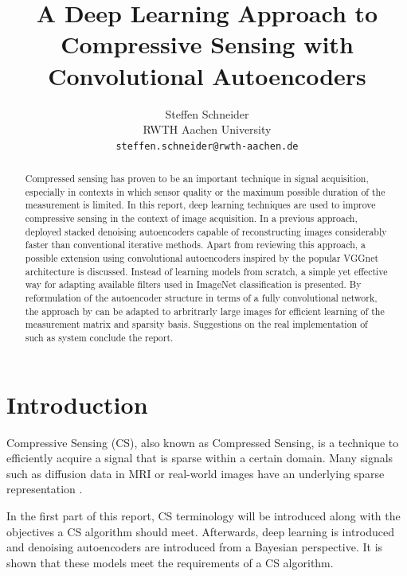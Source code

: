 \documentclass[10pt,twocolumn,a4paper]{article}
\newcommand{\abbr}[2]{#1 (#2)}
\begin{document}
\title{A Deep Learning Approach to\\Compressive Sensing with Convolutional Autoencoders}

\author{Steffen Schneider\\
RWTH Aachen University\\
{\tt\small steffen.schneider@rwth-aachen.de}
}

\maketitle

\begin{abstract}
    Compressed sensing has proven to be an important technique in signal acquisition, especially in contexts in which sensor quality or the maximum possible duration of the measurement is limited. 
    In this report, deep learning techniques are used to improve compressive sensing in the context of image acquisition.
    In a previous approach, \cite{Mousavi2015} deployed stacked denoising autoencoders capable of reconstructing images considerably faster than conventional iterative methods.
    Apart from reviewing this approach, a possible extension using convolutional autoencoders inspired by the popular VGGnet architecture is discussed.
    Instead of learning models from scratch, a simple yet effective way for adapting available filters used in ImageNet classification is presented.
    By reformulation of the autoencoder structure in terms of a fully convolutional network, the approach by \cite{Mousavi2015} can be adapted to arbritrarly large images for efficient learning of the measurement matrix and sparsity basis.
    Suggestions on the real implementation of such as system conclude the report.
\end{abstract}

\section{Introduction}
\abbr{Compressive Sensing}{CS}, also known as Compressed Sensing, is a technique to efficiently acquire a signal that is sparse within a certain domain.
Many signals such as diffusion data in MRI or real-world images have an underlying sparse representation \cite{Donoho2006}.

In the first part of this report, CS terminology will be introduced along with the objectives a CS algorithm should meet.
Afterwards, deep learning is introduced and denoising autoencoders are introduced from a Bayesian perspective.
It is shown that these models meet the requirements of a CS algorithm.
\end{document}
